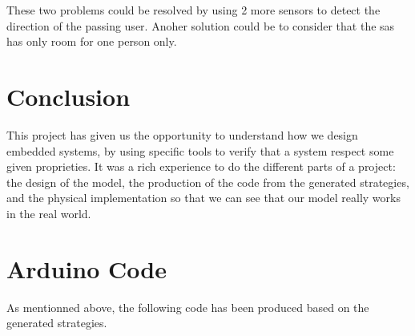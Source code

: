 These two problems could be resolved by using 2 more sensors to detect the direction of the passing user. Anoher solution could be to consider that the sas has only room for one person only.

\section{Conclusion}
This project has given us the opportunity to understand how we design embedded systems, by using specific tools to verify that a system respect some given proprieties. It was a rich experience to do the different parts of a project: the design of the model, the production of the code from the generated strategies, and the physical implementation so that we can see that our model really works in the real world.


\newpage

\appendix

\section{Arduino Code}\label{ap:code}
As mentionned above, the following code has been produced based on the generated strategies.\\

